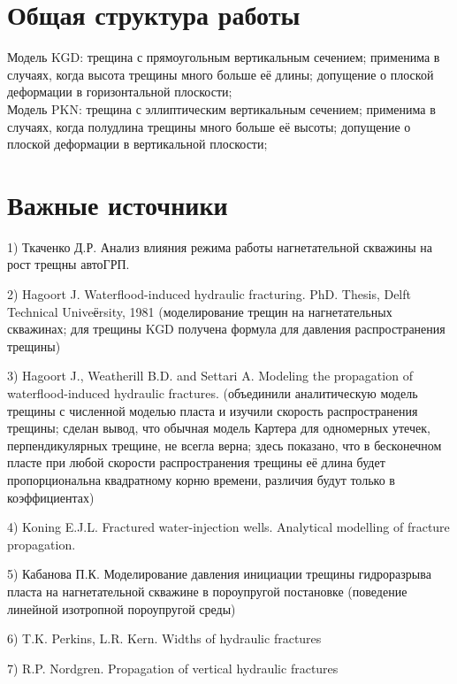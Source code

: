 \documentclass[a4paper, 12pt]{article}
\begin{document}
\tableofcontents
\newpage


\section{Общая структура работы}

Модель KGD: трещина с прямоугольным вертикальным сечением; применима в случаях, когда высота трещины много больше её длины; допущение о плоской деформации в горизонтальной плоскости;
\\

Модель PKN: трещина с эллиптическим вертикальным сечением; применима в случаях, когда полудлина трещины много больше её высоты; допущение о плоской деформации в вертикальной плоскости;
\\

\section{Важные источники}

1) Ткаченко Д.Р. Анализ влияния режима работы нагнетательной скважины на рост трещны автоГРП.

2) Hagoort J. Waterflood-induced hydraulic fracturing. PhD. Thesis, Delft Technical Univeёrsity, 1981 (моделирование трещин на нагнетательных скважинах; для трещины KGD получена формула для давления распространения трещины)

3) Hagoort J., Weatherill B.D. and Settari A. Modeling the propagation of waterflood-induced hydraulic fractures. (объединили аналитическую модель трещины с численной моделью пласта и изучили скорость распространения трещины; сделан вывод, что обычная модель Картера для одномерных утечек, перпендикулярных трещине, не всегла верна; здесь показано, что в бесконечном пласте при любой скорости распространения трещины её длина будет пропорциональна квадратному корню времени, различия будут только в коэффициентах)

4) Koning E.J.L. Fractured water-injection wells. Analytical modelling of fracture propagation.

5) Кабанова П.К. Моделирование давления инициации трещины гидроразрыва пласта на нагнетательной скважине в пороупругой постановке (поведение линейной изотропной пороупругой среды)

6) T.K. Perkins, L.R. Kern. Widths of hydraulic fractures

7) R.P. Nordgren. Propagation of vertical hydraulic fractures
\end{document}
